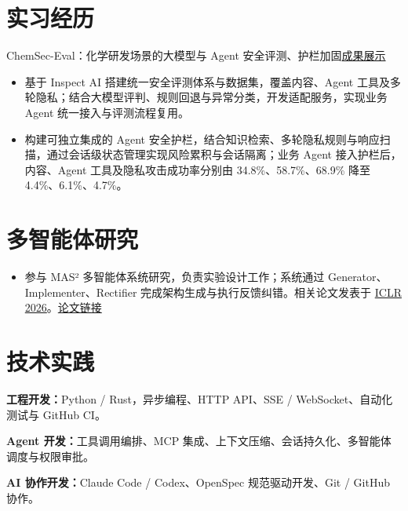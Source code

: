 \documentclass{resume}
\newcommand{\metainfo}[1]{{\fontsize{9.6}{13.7}\selectfont\color{muted}#1\par}\vspace{1.5pt}}
\newcommand{\projectlink}[2]{\href{#1}{\textcolor{muted}{#2}}}
\newcommand{\cvsection}[2]{\section{\texorpdfstring{\makebox[1.35em][l]{\normalfont #1}}{}#2}}
\begin{document}
\cvsection{\faBriefcase}{实习经历}
\metainfo{ChemSec-Eval：化学研发场景的大模型与 Agent 安全评测、护栏加固\quad\projectlink{https://1371149.github.io/jingtai.github.io/}{成果展示}}
\begin{itemize}
  \item 基于 Inspect AI 搭建统一安全评测体系与数据集，覆盖内容、Agent 工具及多轮隐私；结合大模型评判、规则回退与异常分类，开发适配服务，实现业务 Agent 统一接入与评测流程复用。
  \item 构建可独立集成的 Agent 安全护栏，结合知识检索、多轮隐私规则与响应扫描，通过会话级状态管理实现风险累积与会话隔离；业务 Agent 接入护栏后，内容、Agent 工具及隐私攻击成功率分别由 \mbox{34.8\%、58.7\%、68.9\%} 降至 \mbox{4.4\%、6.1\%、4.7\%。}
\end{itemize}

\cvsection{\faFlask}{多智能体研究}
\begin{itemize}
  \item 参与 MAS² 多智能体系统研究，负责实验设计工作；系统通过 Generator、Implementer、Rectifier 完成架构生成与执行反馈纠错。相关论文发表于 \href{https://iclr.cc/virtual/2026/poster/10007200}{ICLR 2026}。\quad\projectlink{https://openreview.net/forum?id=qumy27hMDY}{论文链接}
\end{itemize}

\cvsection{\faCogs}{技术实践}
\textbf{工程开发：}Python / Rust，异步编程、HTTP API、SSE / WebSocket、自动化测试与 GitHub CI。\par
\textbf{Agent 开发：}工具调用编排、MCP 集成、上下文压缩、会话持久化、\mbox{多智能体调度与权限审批。}\par
\textbf{AI 协作开发：}Claude Code / Codex、OpenSpec 规范驱动开发、Git / GitHub 协作。
\end{document}
